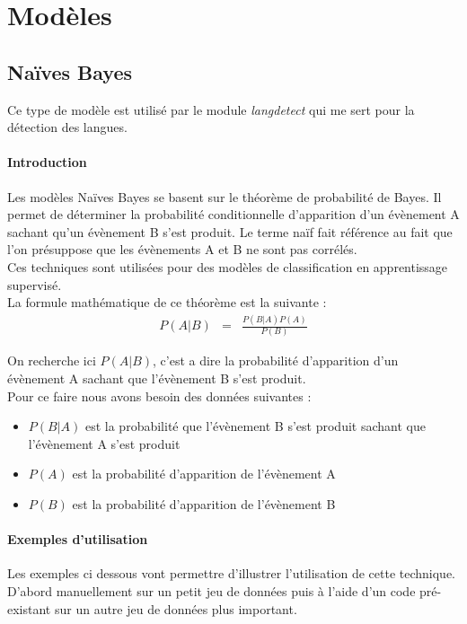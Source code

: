 \documentclass[a4paper,12pt]{article}
\begin{document}
	\section{Modèles}	
		\subsection{Naïves Bayes}
			Ce type de modèle est utilisé par le module \emph{langdetect} qui me sert pour la détection des langues.
			
			\paragraph{Introduction}
				Les modèles Naïves Bayes se basent sur le théorème de probabilité de Bayes. Il permet de déterminer la probabilité conditionnelle d'apparition d'un évènement A sachant qu'un évènement B s'est produit. Le terme naïf fait référence au fait que l'on présuppose que les évènements A et B ne sont pas corrélés.\\
				Ces techniques sont utilisées pour des modèles de classification en apprentissage supervisé.\\
				
				La formule mathématique de ce théorème est la suivante :
				\begin{eqnarray}\label{NBeq}
					P(A|B) &=& \frac{P(B|A)P(A)}{P(B)}
				\end{eqnarray}
				
			On recherche ici $P(A|B)$, c'est a dire la probabilité d'apparition d'un évènement A sachant que l'évènement B s'est produit. \\ 
			
			Pour ce faire nous avons besoin des données suivantes :
			\begin{itemize}
				\item $P(B|A)$ est la probabilité que l'évènement B s'est produit sachant que l'évènement A s'est produit
				\item $P(A)$ est la probabilité d'apparition de l'évènement A
				\item $P(B)$ est la probabilité d'apparition de l'évènement B
			\end{itemize}
			
			\paragraph{Exemples d'utilisation}
				Les exemples ci dessous vont permettre d'illustrer l'utilisation de cette technique. D'abord manuellement sur un petit jeu de données puis à l'aide d'un code pré-existant sur un autre jeu de données plus important.
				
\end{document}
